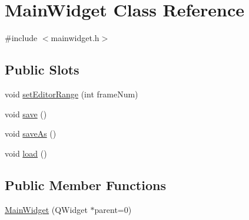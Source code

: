 \hypertarget{class_main_widget}{
\section{\-Main\-Widget \-Class \-Reference}
\label{class_main_widget}
}


{\ttfamily \#include $<$mainwidget.\-h$>$}

\subsection*{\-Public \-Slots}
\begin{DoxyCompactItemize}
\item 
void \hyperlink{class_main_widget_abe818c864bcdc88ec88d8dbde2d43023}{set\-Editor\-Range} (int frame\-Num)
\item 
void \hyperlink{class_main_widget_a8a47d66fca458e2aa71de66354a7b75a}{save} ()
\item 
void \hyperlink{class_main_widget_a8e2b0a1d2401a7f7e0e83a2541a6614b}{save\-As} ()
\item 
void \hyperlink{class_main_widget_af232b6a9c032049b200a6c16f6ea651c}{load} ()
\end{DoxyCompactItemize}
\subsection*{\-Public \-Member \-Functions}
\begin{DoxyCompactItemize}
\item 
\hyperlink{class_main_widget_a326fee5088b7cebaa102ed5332dd59ee}{\-Main\-Widget} (\-Q\-Widget $\ast$parent=0)
\end{DoxyCompactItemize}

